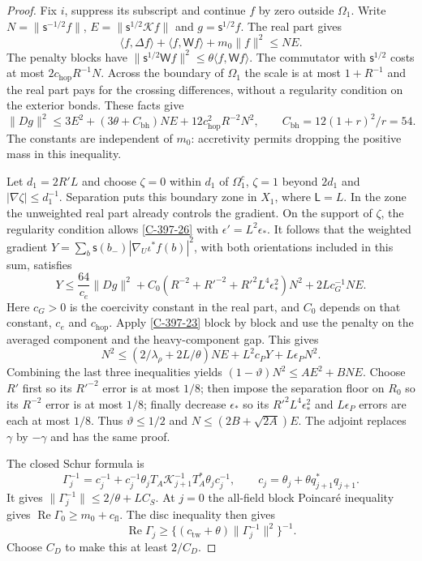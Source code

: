 \documentclass[11pt,letterpaper,reqno]{amsart}
\theoremstyle{definition}
\theoremstyle{remark}
\begin{document}
\begin{proof}
Fix $i$, suppress its subscript and continue $f$ by zero outside
$\Omega_1$.  Write
$N=\|\mathsf s^{-1/2}f\|$, $E=\|\mathsf s^{1/2}\mathcal Kf\|$
and $g=\mathsf s^{1/2}f$.  The real part gives
\[
 \langle f,\Delta f\rangle+\langle f,\mathsf Wf\rangle
                         +m_0\|f\|^2\le NE.
\]
The penalty blocks have
$\|\mathsf s^{1/2}\mathsf Wf\|^2
\le\theta\langle f,\mathsf Wf\rangle$.
The commutator with $\mathsf s^{1/2}$ costs at most
$2c_{\mathrm{hop}}R^{-1}N$.
Across the boundary of $\Omega_1$ the scale is at most
$1+R^{-1}$ and the real part pays for the crossing differences,
without a regularity condition on the exterior bonds.  These facts
give
\[
 \|Dg\|^2\le3E^2+(3\theta+C_{\mathrm{bh}})NE
                           +12c_{\mathrm{hop}}^2R^{-2}N^2,
 \qquad C_{\mathrm{bh}}=12(1+r)^2/r=54.
\]
The constants are independent of $m_0$: accretivity permits dropping the positive
mass in this inequality.

Let $d_1=2R'L$ and choose $\zeta=0$ within $d_1$ of
$\Omega_1^c$, $\zeta=1$ beyond $2d_1$ and
$|\nabla\zeta|\le d_1^{-1}$.  Separation puts this boundary zone
in $X_1$, where $\mathsf L=L$.  In the zone the unweighted real
part already controls the gradient.  On the support of $\zeta$,
the regularity condition allows \cref{C-397-26} with
$\epsilon'=L^2\epsilon_*$.  It follows that the weighted gradient
$Y=\sum_b\mathsf s(b_-)|\nabla_U\iota^*f(b)|^2$, with both
orientations included in this sum, satisfies
\[
 Y\le\frac{64}{c_e}\|Dg\|^2+C_0
       (R^{-2}+R'^{-2}+R'^2L^4\epsilon_*^2)N^2
                          +2Lc_G^{-1}NE.
\]
Here $c_G>0$ is the coercivity constant in the real part, and
$C_0$ depends on that constant, $c_e$ and $c_{\mathrm{hop}}$.
Apply \cref{C-397-23} block by block and use the penalty on the
averaged component and the heavy-component gap.  This gives
\[
 N^2\le(2/\lambda_\rho+2L/\theta)NE
                             +L^2c_PY+L\epsilon_PN^2.
\]
Combining the last three inequalities yields
$(1-\vartheta)N^2\le A E^2+BNE$.
Choose $R'$ first so its $R'^{-2}$ error is at most $1/8$;
then impose the separation floor on $R_0$ so its $R^{-2}$
error is at most $1/8$; finally decrease $\epsilon_*$ so its
$R'^2L^4\epsilon_*^2$ and $L\epsilon_P$ errors are each at
most $1/8$.  Thus $\vartheta\le1/2$ and
$N\le(2B+\sqrt{2A})E$.  The adjoint replaces $\gamma$ by
$-\gamma$ and has the same proof.

The closed Schur formula is
\[
 \Gamma_j^{-1}=c_j^{-1}+c_j^{-1}\theta_jT_A
               \mathcal K_{j+1}^{-1}T_A^*\theta_jc_j^{-1},
 \qquad c_j=\theta_j+\theta q_{j+1}^*q_{j+1}.
\]
It gives $\|\Gamma_j^{-1}\|\le2/\theta+LC_S$.
At $j=0$ the all-field block Poincar\'e inequality gives
$\operatorname{Re}\Gamma_0\ge m_0+c_{\mathrm{fl}}$.
The disc inequality then gives
\[
 \operatorname{Re}\Gamma_j\ge
 \{(c_{\mathrm{tw}}+\theta)\|\Gamma_j^{-1}\|^2\}^{-1}.
\]
Choose $C_D$ to make this at least $2/C_D$.


\end{proof}
\end{document}
